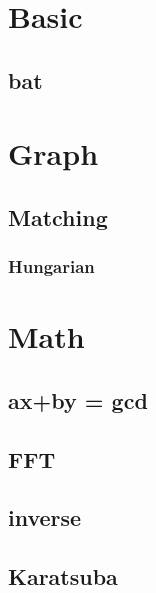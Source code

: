\section{Basic}
	\subsection{bat}
		


\section{Graph}
	\subsection{Matching}
		\subsubsection{Hungarian}
			

\section{Math}
	\subsection{ ax+by = gcd }
		
	\subsection{ FFT }
		
	\subsection{ inverse }
		
	\subsection{ Karatsuba }
		

